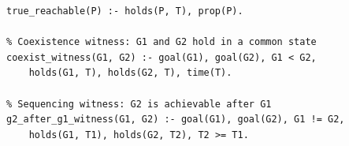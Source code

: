 \begin{lstlisting}[caption={Witness atoms for brave reasoning.},label={lst:witnesses},style=asp]
% True reachability: P appears in some reachable state
true_reachable(P) :- holds(P, T), prop(P).

% Coexistence witness: G1 and G2 hold in a common state
coexist_witness(G1, G2) :- goal(G1), goal(G2), G1 < G2,
    holds(G1, T), holds(G2, T), time(T).

% Sequencing witness: G2 is achievable after G1
g2_after_g1_witness(G1, G2) :- goal(G1), goal(G2), G1 != G2,
    holds(G1, T1), holds(G2, T2), T2 >= T1.
\end{lstlisting}
